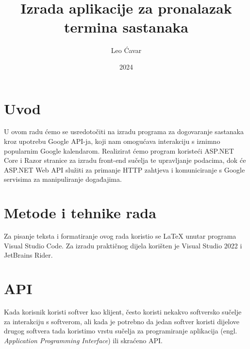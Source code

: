 \documentclass{foi}
\title{Izrada aplikacije za pronalazak termina sastanaka}
\author{Leo Ćavar}
\date{2024}
\begin{document}
\maketitle

\tableofcontents

\pagestyle{plain}
\chapter{Uvod}
U ovom radu ćemo se usredotočiti na izradu programa za dogovaranje sastanaka kroz upotrebu Google API-ja, koji nam omogućava interakciju s iznimno popularnim Google kalendarom. Realizirat ćemo program koristeći ASP.NET Core i Razor stranice za izradu front-end sučelja te upravljanje podacima, dok će ASP.NET Web API služiti za primanje HTTP zahtjeva i komuniciranje s Google servisima za manipuliranje događajima.

\chapter{Metode i tehnike rada}
Za pisanje teksta i formatiranje ovog rada koristio se LaTeX unutar programa Visual Studio Code. Za izradu praktičnog dijela korišten je Visual Studio 2022 i JetBrains Rider.

\chapter{API}
Kada korisnik koristi softver kao klijent, često koristi nekakvo softversko sučelje za interakciju s softverom, ali kada je potrebno da jedan softver koristi dijelove drugog softvera tada koristimo vrstu sučelja za programiranje aplikacija (engl. \textit{Application Programming Interface}) ili skraćeno API.\cite{biehl2015api}
\end{document}
